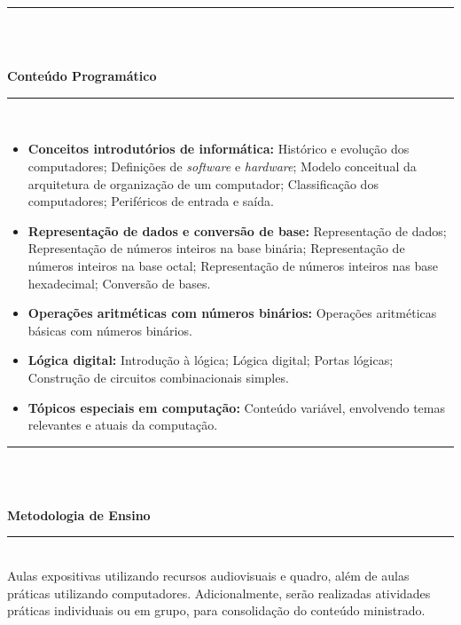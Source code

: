 \noindent\rule{16.5cm}{0.4pt}\\
\\
\vspace{-12mm}
\begin{center}\textbf{Conteúdo Programático}\end{center}
\vspace{-5mm}
\noindent\rule{16.5cm}{0.4pt}
\\
\begin{itemize}

 \item \textbf{Conceitos introdut\'orios de inform\'atica:} Histórico e evolução dos computadores; Defini\c{c}\~oes de \textit{software} e \textit{hardware}; Modelo conceitual da arquitetura de organiza\c{c}\~ao de um computador; Classifica\c{c}\~ao dos computadores; Perif\'ericos de entrada e sa\'ida.

 \item \textbf{Representa\c{c}\~ao de dados e convers\~ao de base:} Representação de dados; Representação de números inteiros na base binária; Representação de números inteiros na base octal; Representação de números inteiros nas base hexadecimal; Convers\~ao de bases.

 \item \textbf{Opera\c{c}\~oes aritm\'eticas com n\'umeros bin\'arios:} Opera\c{c}\~oes aritm\'eticas b\'asicas com n\'umeros bin\'arios.

 \item \textbf{L\'ogica digital:} Introdu\c{c}\~ao \`a l\'ogica; L\'ogica digital; Portas l\'ogicas; Constru\c{c}\~ao de circuitos combinacionais simples.

 \item \textbf{T\'opicos especiais em computa\c{c}\~ao:} Conte\'udo vari\'avel, envolvendo temas relevantes e atuais da computa\c{c}\~ao.

\end{itemize}
\noindent\rule{16.5cm}{0.4pt}\\
\\
\vspace{-12mm}
\begin{center}\textbf{Metodologia de Ensino}\end{center} 
\vspace{-5mm}
\noindent\rule{16.5cm}{0.4pt}
\\
   Aulas expositivas utilizando recursos audiovisuais e quadro, além de aulas práticas utilizando computadores. Adicionalmente, serão realizadas atividades práticas individuais ou em grupo, para consolidação do conteúdo ministrado.\\
